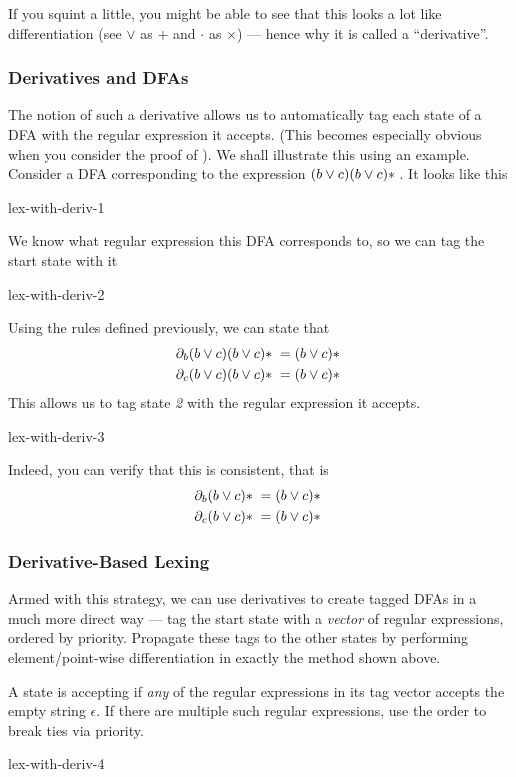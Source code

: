 If you squint a little, you might be able to see that this looks a lot like differentiation (see $\lor$ as $+$ and $\cdot$ as $\times$) --- hence why it is called a ``derivative''.

\subsubsection{Derivatives and DFAs}
The notion of such a derivative allows us to automatically tag each state of a DFA with the regular expression it accepts. (This becomes especially obvious when you consider the proof of ). We shall illustrate this using an example. Consider a DFA corresponding to the expression $(b \lor c)(b\lor c)\*$. It looks like this

\begin{center}
    {lex-with-deriv-1}
\end{center}

We know what regular expression this DFA corresponds to, so we can tag the start state with it

\begin{center}
    {lex-with-deriv-2}
\end{center}

Using the rules defined previously, we can state that 
\begin{align*}
    \partial_b (b \lor c)(b \lor c)\* = (b \lor c)\*\\
    \partial_c (b \lor c)(b \lor c)\* = (b \lor c)\*
\end{align*}
This allows us to tag state \textit{2} with the regular expression it accepts.

\begin{center}
    {lex-with-deriv-3}
\end{center}

Indeed, you can verify that this is consistent, that is
\begin{align*}
    \partial_b (b \lor c)\* = (b \lor c)\*\\
    \partial_c (b \lor c)\* = (b \lor c)\*
\end{align*}

\subsubsection{Derivative-Based Lexing}
Armed with this strategy, we can use derivatives to create tagged DFAs in a much more direct way --- tag the start state with a \emph{vector} of regular expressions, ordered by priority. Propagate these tags to the other states by performing element/point-wise differentiation in exactly the method shown above. 

A state is accepting if \textit{any} of the regular expressions in its tag vector accepts the empty string $\epsilon$. If there are multiple such regular expressions, use the order to break ties via priority.

\begin{center}
    {lex-with-deriv-4}
\end{center}